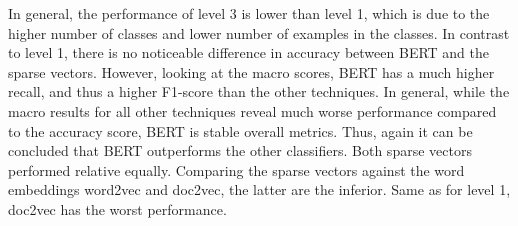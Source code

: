 \documentclass[12pt, a4paper, titlepage]{article}
\begin{document}
\begin{table}[hb!]
\caption{\label{tab: T10} Evaluation of Level 3 Classification - Macro}
\end{table}

In general, the performance of level 3 is lower than level 1, which is due to the higher number of classes and lower number of examples in the classes. In contrast to level 1, there is no noticeable difference in accuracy between \ac{BERT} and the sparse vectors. However, looking at the macro scores, \ac{BERT} has a much higher recall, and thus a higher F1-score than the other techniques. In general, while the macro results for all other techniques reveal much worse performance compared to the accuracy score, \ac{BERT} is stable overall metrics. Thus, again it can be concluded that \ac{BERT} outperforms the other classifiers. Both sparse vectors performed relative equally. Comparing the sparse vectors against the word embeddings word2vec and doc2vec, the latter are the inferior. Same as for level 1, doc2vec has the worst performance.
\end{document}
